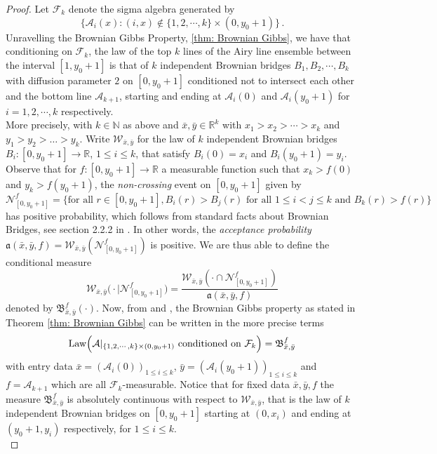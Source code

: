 \documentclass[12pt]{report}
\theoremstyle{plain}
\newcommand{\N}{\ensuremath{\mathbb{N}}}
\newcommand{\R}{\ensuremath{\mathbb{R}}}
\begin{document}
\begin{proof}[Proof]
Let $\mathcal{F}_k$ denote the sigma algebra generated by
\[
\{\mathcal{A}_i(x): (i,x)\not\in\{1,2,\cdots,k\}\times(0,y_0+1)\}\,.
\]
Unravelling the Brownian Gibbs Property, \ref{thm: Brownian Gibbs}, we have that conditioning on $\mathcal{F}_k$, the law of the top $k$ lines of the Airy line ensemble between the interval $[1,y_0+1]$ is that of $k$ independent Brownian bridges $B_1, B_2, \cdots, B_k$ with diffusion parameter $2$ on $[0,y_0+1]$ conditioned not to intersect each other and the bottom line $\mathcal{A}_{k+1}$, starting and ending at $\mathcal{A}_i(0)$ and $\mathcal{A}_i(y_0+1)$ for $i = 1,2,\cdots, k$ respectively.\\

More precisely, with $k\in \N$ as above and $\bar{x},\bar{y}\in \R^k$ with $x_1>x_2>\cdots>x_k$ and $y_1>y_2>\dots>y_k$. Write $\mathcal{W}_{\bar{x},\bar{y}}$ for the law of $k$ independent Brownian bridges $B_i:[0,y_0+1] \to \R$, $1 \leq i \leq k$, that satisfy $B_i(0) = x_i$ and $B_i(y_0+1) = y_i$. Observe that for $f:[0,y_0+1] \to \R$ a measurable function such that $x_{k}>f(0)$ and $y_k>f(y_0+1)$, the \textit{non-crossing} event on $ [0,y_0+1]$ given by
\begin{equation*}
\mathcal{N}^f_{[0,y_0+1]} =\Big\{\text{for all } r\in [0,y_0+1],  B_{i}(r) > B_{j}(r) \textrm{ for all } 1\leq i<j\leq k \textrm{ and  $B_k(r) > f(r)$} \Big\}
\end{equation*}
has positive probability, which follows from standard facts about Brownian Bridges, see section 2.2.2 in \cite{corwin2014brownian}. In other words, the {\it acceptance probability} $\mathfrak{a}(\bar{x},\bar{y},f)= \mathcal{W}_{\bar{x},\bar{y}}(\mathcal{N}_{[0,y_0+1]}^f)$ is positive. We are thus able to define the conditional measure \[
\mathcal{W}_{\bar{x},\bar{y}} \big( \cdot \big\vert \mathcal{N}^f_{[0,y_0+1]} \big)
= \frac{\mathcal{W}_{\bar{x},\bar{y}}(\cdot\cap \mathcal{N}_{[0,y_0+1]}^f)}{\mathfrak{a}(\bar{x},\bar{y},f)}\]
denoted by $\mathfrak{B}_{\bar{x},\bar{y}}^f(\cdot)$. Now, from \cite{corwin2014brownian} and \cite{hammond2021brownian}, the Brownian Gibbs property as stated in Theorem \ref{thm: Brownian Gibbs} can be written in the more precise terms
\[
\text{Law}\Bigl(\mathbf{\mathcal{A}}|_{\{1,2,\cdots,k\}\times(0,y_0+1)} \text{ conditioned on } \mathcal{F}_k\Bigr) = \mathfrak{B}_{\bar{x},\bar{y}}^f
\]
with entry data $\bar{x} = (\mathcal{A}_i(0))_{1\leq i\leq k}$, $\bar{y} = (\mathcal{A}_i(y_0+1))_{1\leq i\leq k}$ and $f = \mathcal{A}_{k+1}$ which are all $\mathcal{F}_k$-measurable. Notice that for fixed data $\bar{x}, \bar{y}, f$ the measure $\mathfrak{B}_{\bar{x},\bar{y}}^f$ is absolutely continuous with respect to $\mathcal{W}_{\bar{x},\bar{y}}$, that is the law of $k$ independent Brownian bridges on $[0,y_0+1]$ starting at $(0,x_i)$ and ending at $(y_0+1,y_i)$ respectively, for $1\leq i\leq k$.\\


\end{proof}
\end{document}
